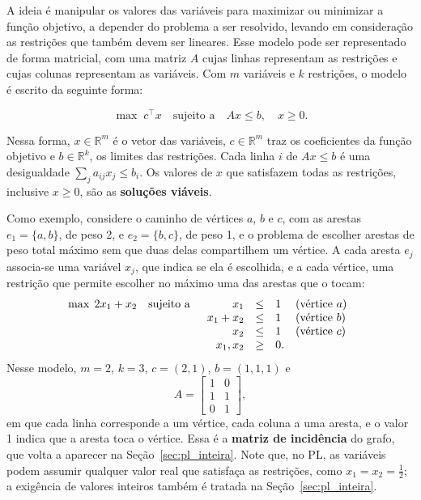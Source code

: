 A ideia é manipular os valores das variáveis para maximizar ou minimizar a função objetivo, a depender do problema a ser resolvido, levando em consideração as restrições que também devem ser lineares. Esse modelo pode ser representado de forma matricial, com uma matriz $A$ cujas linhas representam as restrições e cujas colunas representam as variáveis. Com $m$ variáveis e $k$ restrições, o modelo é escrito da seguinte forma:

\begin{equation}
    \max \; c^{\top} x \quad \text{sujeito a} \quad A x \le b, \quad x \ge 0.
    \label{eq:pl_primal}
\end{equation}

Nessa forma, $x \in \mathbb{R}^m$ é o vetor das variáveis, $c \in \mathbb{R}^m$ traz os coeficientes da função objetivo e $b \in \mathbb{R}^k$, os limites das restrições. Cada linha $i$ de $A x \le b$ é uma desigualdade $\sum_j a_{ij} x_j \le b_i$. Os valores de $x$ que satisfazem todas as restrições, inclusive $x \ge 0$, são as \textbf{soluções viáveis}.

Como exemplo, considere o caminho de vértices $a$, $b$ e $c$, com as arestas $e_1 = \{a, b\}$, de peso 2, e $e_2 = \{b, c\}$, de peso 1, e o problema de escolher arestas de peso total máximo sem que duas delas compartilhem um vértice. A cada aresta $e_j$ associa-se uma variável $x_j$, que indica se ela é escolhida, e a cada vértice, uma restrição que permite escolher no máximo uma das arestas que o tocam:
\begin{equation}
    \max \; 2x_1 + x_2 \quad \text{sujeito a} \quad
    \begin{array}[t]{rcll}
        x_1       & \le & 1 & \text{(vértice $a$)} \\
        x_1 + x_2 & \le & 1 & \text{(vértice $b$)} \\
        x_2       & \le & 1 & \text{(vértice $c$)} \\
        x_1, x_2  & \ge & 0. &
    \end{array}
    \label{eq:pl_exemplo}
\end{equation}
Nesse modelo, $m = 2$, $k = 3$, $c = (2, 1)$, $b = (1, 1, 1)$ e
\begin{equation*}
    A = \begin{bmatrix} 1 & 0 \\ 1 & 1 \\ 0 & 1 \end{bmatrix},
\end{equation*}
em que cada linha corresponde a um vértice, cada coluna a uma aresta, e o valor 1 indica que a aresta toca o vértice. Essa é a \textbf{matriz de incidência} do grafo, que volta a aparecer na Seção~\ref{sec:pl_inteira}. Note que, no PL, as variáveis podem assumir qualquer valor real que satisfaça as restrições, como $x_1 = x_2 = \frac{1}{2}$; a exigência de valores inteiros também é tratada na Seção~\ref{sec:pl_inteira}.

